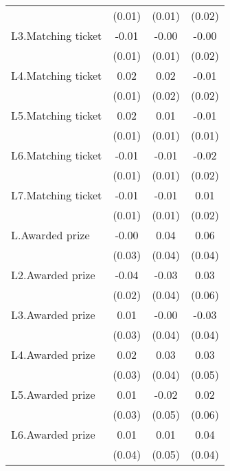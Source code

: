 \begin{table}[htbp]
{\begin{threeparttable}
\begin{tabular}{l*{3}{c}}
                &   (0.01)         &   (0.01)         &   (0.02)         \\
L3.Matching ticket&    -0.01         &    -0.00         &    -0.00         \\
                &   (0.01)         &   (0.01)         &   (0.02)         \\
L4.Matching ticket&     0.02\sym{*}  &     0.02         &    -0.01         \\
                &   (0.01)         &   (0.02)         &   (0.02)         \\
L5.Matching ticket&     0.02         &     0.01         &    -0.01         \\
                &   (0.01)         &   (0.01)         &   (0.01)         \\
L6.Matching ticket&    -0.01         &    -0.01         &    -0.02         \\
                &   (0.01)         &   (0.01)         &   (0.02)         \\
L7.Matching ticket&    -0.01         &    -0.01         &     0.01         \\
                &   (0.01)         &   (0.01)         &   (0.02)         \\
L.Awarded prize &    -0.00         &     0.04         &     0.06         \\
                &   (0.03)         &   (0.04)         &   (0.04)         \\
L2.Awarded prize&    -0.04\sym{*}  &    -0.03         &     0.03         \\
                &   (0.02)         &   (0.04)         &   (0.06)         \\
L3.Awarded prize&     0.01         &    -0.00         &    -0.03         \\
                &   (0.03)         &   (0.04)         &   (0.04)         \\
L4.Awarded prize&     0.02         &     0.03         &     0.03         \\
                &   (0.03)         &   (0.04)         &   (0.05)         \\
L5.Awarded prize&     0.01         &    -0.02         &     0.02         \\
                &   (0.03)         &   (0.05)         &   (0.06)         \\
L6.Awarded prize&     0.01         &     0.01         &     0.04         \\
                &   (0.04)         &   (0.05)         &   (0.04)         \\

\end{tabular}
\end{threeparttable}}
\end{table}
